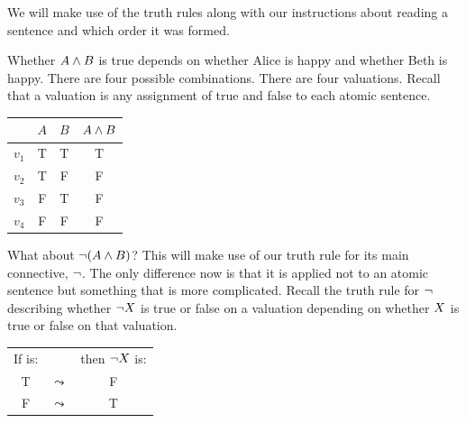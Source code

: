 We will make use of the truth rules along with our instructions about reading a sentence and which order it was formed. 


Whether $A\mathbin{\wedge} B$ is true depends on whether Alice is happy and whether Beth is happy.
There are four possible combinations. There are four valuations. Recall that a valuation is any assignment of true and false to each atomic sentence. 
\begin{center}
	\begin{tabular}{rcc|c}
	&	$A$&$B$&$A\mathbin{\wedge} B$\\\hline
	$v_1$&	T&T&T\\
	$v_2$&	T&F&F\\
	$v_3$&	F&T&F\\
	$v_4$&	F&F&F
	\end{tabular}
\end{center}

What about $\neg(A\mathbin{\wedge} B)$? This will make use of our truth rule for its main connective, $\neg$. The only difference now is that it is applied not to an atomic sentence but something that is more complicated. Recall the truth rule for $\neg$ describing whether $\neg X$ is true or false on a valuation depending on whether $X$ is true or false on that valuation. 
\begin{center}
	\begin{tabular}{ccc}
	If \metaX is:&&then $\neg X$ is:\\
	T &$\leadsto$& F\\
	F &$\leadsto$& T
\end{tabular}
\end{center}

